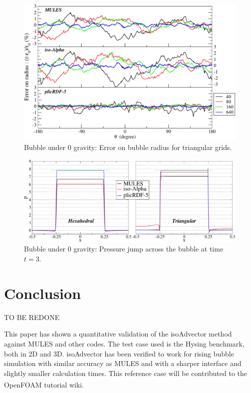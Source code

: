 \documentclass[review]{elsarticle}
\begin{document}
\begin{figure}[!h]
  \includegraphics[width=\textwidth]{figures/spuriousCurrents_bubble_error_radius_uns.pdf}
  \caption{Bubble under 0 gravity: Error on bubble radius for triangular grids.}
  \label{fig:spuriousCurrents_bubble_error_radius_uns}
\end{figure}

\begin{figure}[!h]
  \includegraphics[width=\textwidth]{figures/spuriousCurrents_pressure_drop_t=3_160x320.pdf}
  \caption{Bubble under 0 gravity: Pressure jump across the bubble at time $t=3$.}
  \label{fig:spuriousCurrents_pressure_jump}
\end{figure}



\section{\small Conclusion}

TO BE REDONE

This paper has shown a quantitative validation of the isoAdvector method against MULES and other 
codes. The test case used is the Hysing benchmark, both in 2D and 3D. isoAdvector has been verified to work for rising bubble simulation with similar accuracy as MULES and with a sharper interface and slightly smaller calculation times.
This reference case will be contributed to the OpenFOAM\textsuperscript{\textregistered} tutorial wiki.
\end{document}
